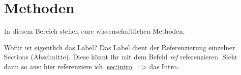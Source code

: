 \section{Methoden}\label{sec:meth}
In diesem Bereich stehen eure wissenschaftlichen Methoden. 

Wofür ist eigentlich das Label? Das Label dient der Referenzierung einzelner Sections (Abschnitte). Diese könnt ihr mit dem Befehl \emph{ref} referenzieren. Sieht dann so aus: hier referenziere ich \ref{sec:intro} => das Intro.